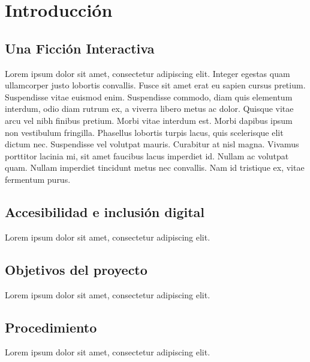 
\chapter{Introducción}\label{ch:introduccion}

\section{Una Ficción Interactiva}

Lorem ipsum dolor sit amet\cite{Montfort:2004}, consectetur adipiscing elit. Integer egestas quam ullamcorper justo lobortis convallis. Fusce sit amet erat eu sapien cursus pretium. Suspendisse vitae euismod enim. Suspendisse commodo, diam quis elementum interdum, odio diam rutrum ex, a viverra libero metus ac dolor. Quisque vitae arcu vel nibh finibus pretium. Morbi vitae interdum est. Morbi dapibus ipsum non vestibulum fringilla. Phasellus lobortis turpis lacus, quis scelerisque elit dictum nec. Suspendisse vel volutpat mauris. Curabitur at nisl magna. Vivamus porttitor lacinia mi, sit amet faucibus lacus imperdiet id. Nullam ac volutpat quam. Nullam imperdiet tincidunt metus nec convallis. Nam id tristique ex, vitae fermentum purus.

\section{Accesibilidad e inclusión digital}

Lorem ipsum\cite{Wilson:2002} dolor sit amet, consectetur adipiscing elit.

\section{Objetivos del proyecto}

Lorem ipsum dolor sit amet, consectetur adipiscing elit.

\section{Procedimiento}

Lorem ipsum dolor sit amet, consectetur adipiscing elit.
